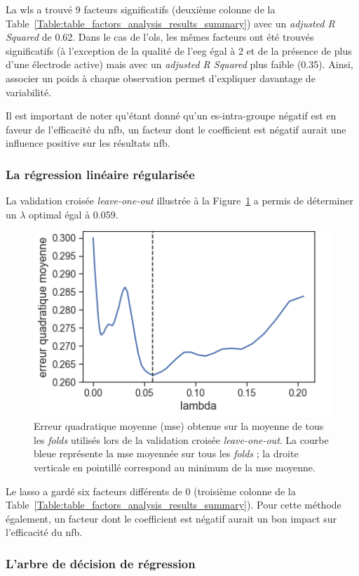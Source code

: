 La \gls{wls} a trouvé 9 facteurs significatifs (deuxième colonne de la Table~\ref{Table:table_factors_analysis_results_summary}) avec un \textit{adjusted R Squared} de 0.62. 
Dans le cas de l'\gls{ols}, les mêmes facteurs ont été trouvés significatifs (à l'exception de la qualité de 
l'\gls{eeg} égal à 2 et de la présence de plus d'une électrode active) mais avec un \textit{adjusted R Squared} plus faible (0.35). Ainsi, associer un poids
à chaque observation permet d'expliquer davantage de variabilité. 

Il est important de noter qu'étant donné qu'un \gls{es}-intra-groupe négatif est en faveur de l'efficacité du \gls{nfb},
un facteur dont le coefficient est négatif aurait une influence positive sur les résultats \gls{nfb}.


\subsubsection{La régression linéaire régularisée}

La validation croisée \textit{leave-one-out} illustrée à la Figure~\ref{Figure:selection_lambda_lasso} a permis de déterminer un $\lambda$ optimal égal à 0.059.
\begin{figure}[h!]
  \centering
	\includegraphics[width=0.5\linewidth]{figures/chapter-3/factors-selection-lasso-best-lambda} 
  \caption{Erreur quadratique moyenne (\gls{mse}) obtenue sur la moyenne de tous les \textit{folds} utilisés lors de la validation 
	croisée \textit{leave-one-out}. La courbe bleue représente la \gls{mse} moyennée sur tous les \textit{folds} ; la droite verticale en pointillé correspond
	au minimum de la \gls{mse} moyenne.}
  \label{Figure:selection_lambda_lasso}
\end{figure}

Le \gls{lasso} a gardé six facteurs différents de 0 (troisième colonne de la Table~\ref{Table:table_factors_analysis_results_summary}). Pour cette méthode également,
un facteur dont le coefficient est négatif aurait un bon impact sur l'efficacité du \gls{nfb}.

\subsubsection{L'arbre de décision de régression}


